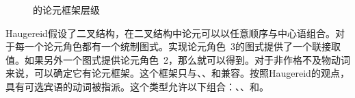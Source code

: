 \begin{exe}
\begin{xlist}[iv.]
\begin{exe}
\begin{xlist}[iv.]
\begin{figure}
{}
\caption{\label{Abbildung-Haugereid} \citet{Haugereid2007a}的论元框架层级}
\end{figure}%
Haugereid假设了二叉结构，在二叉结构中论元可以以任意顺序与中心语组合。对于每一个论元角色都有一个统制图式。实现论元角色~3的图式提供了一个联接取值。如果另外一个图式提供论元角色~2，那么就可以得到。对于非作格不及物动词来说，可以确定它有论元框架。这个框架只与、、和兼容。按照Haugereid的观点，具有可选宾语的动词被指派。这个类型允许以下组合：、、和。


\end{xlist}
\end{exe}
\end{xlist}
\end{exe}
